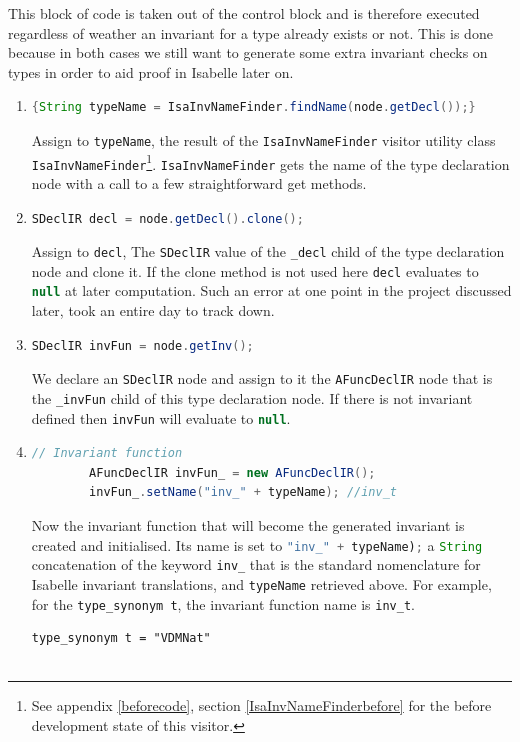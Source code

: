 	This block of code is taken out of the control block and is therefore executed regardless of weather an invariant for a type already exists or not. This is done because in both cases we still want to generate some extra invariant checks on types in order to aid proof in Isabelle later on.
	\begin{enumerate}
		\item \begin{lstlisting}[language=Java] 
		{String typeName = IsaInvNameFinder.findName(node.getDecl());}
		\end{lstlisting}
	  	Assign to \lstinline[language=Java]{typeName}, the result of the \lstinline[language=Java]{IsaInvNameFinder} visitor utility class \lstinline[language=Java]{IsaInvNameFinder}\footnote{See appendix \ref{beforecode}, section \ref{IsaInvNameFinderbefore} for the before development state of this visitor.}. \lstinline[language=Java]{IsaInvNameFinder} gets the name of the type declaration node with a call to a few straightforward get methods.
		\item \begin{lstlisting}[language=Java] 
		SDeclIR decl = node.getDecl().clone();
		\end{lstlisting} 
		Assign to \lstinline[language=Java]{decl}, The \lstinline[language=Java]{SDeclIR} value of the \lstinline[language=Java]{_decl} child of the type declaration node and clone it. If the clone method is not used here \lstinline[language=Java]{decl} evaluates to \lstinline[language=Java]{null} at later computation. Such an error at one point in the project discussed later, took an entire day to track down.
		\item \begin{lstlisting}[language=Java] 
		SDeclIR invFun = node.getInv();
	    \end{lstlisting}
	    We declare an \lstinline[language=Java]{SDeclIR} node and assign to it the \lstinline[language=Java]{AFuncDeclIR} node that is the \lstinline[language=Java]{_invFun} child of this type declaration node. If there is not invariant defined then \lstinline[language=Java]{invFun} will evaluate to \lstinline[language=Java]{null}.
	    \item \begin{lstlisting}[language=Java] 
		// Invariant function
	    AFuncDeclIR invFun_ = new AFuncDeclIR();
	    invFun_.setName("inv_" + typeName); //inv_t
	    \end{lstlisting}
	    Now the invariant function that will become the generated invariant is created and initialised. Its name is set to \lstinline[language=Java]{"inv_" + typeName);} a \lstinline[language=Java]{String} concatenation of the keyword \lstinline[language=Java]{inv_} that is the standard nomenclature for Isabelle invariant translations, and \lstinline[language=Java]{typeName} retrieved above. For example, for the \lstinline[language=Isabelle]{type_synonym t}, the invariant function name is \lstinline[language=Isabelle]{inv_t}.
	    \begin{lstlisting}[language = Isabelle]
	    type_synonym t = "VDMNat"


\end{lstlisting}
\end{enumerate}
